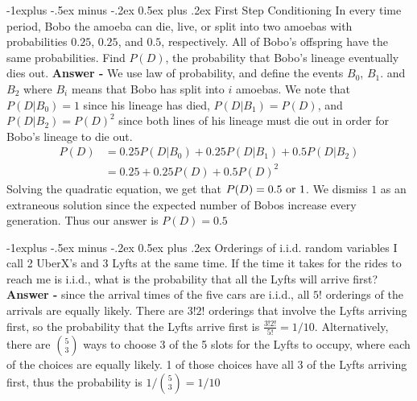\documentclass[10pt,landscape]{article}
\makeatletter
\renewcommand{\subsection}{\@startsection{subsection}{2}{0mm}%
                                {-1explus -.5ex minus -.2ex}%
                                {0.5ex plus .2ex}%
                                {\normalfont\normalsize\bfseries}}
\makeatother
\begin{document}
\begin{multicols}{3}
\subsection{First Step Conditioning} In every time period, Bobo the amoeba can die, live, or split into two amoebas with probabilities $0.25$, $0.25$, and $0.5$, respectively. All of Bobo's offspring have the same probabilities. Find $P(D)$, the probability that Bobo's lineage eventually dies out. \textbf{Answer - } We use law of probability, and define the events $B_0$, $B_1$. and $B_2$ where $B_i$ means that Bobo has split into $i$ amoebas. We note that $P(D | B_0) = 1$ since his lineage has died, $P(D | B_1) = P(D)$, and $P(D | B_2) = P(D)^2$ since  both lines of his lineage must die out in order for Bobo's lineage to die out.
\begin{align*}
P(D) &= 0.25P(D|B_0) + 0.25 P(D|B_1) + 0.5 P(D|B_2)\\
&= 0.25 + 0.25P(D) + 0.5P(D)^2
\end{align*}
Solving the quadratic equation, we get that $P(D) = 0.5 \textnormal{ or } 1$. We dismiss $1$ as an extraneous solution since the expected number of Bobos increase every generation. Thus our answer is $\boxed{P(D) = 0.5}$

\subsection{Orderings of i.i.d. random variables}
I call 2 UberX's and 3 Lyfts at the same time. If the time it takes for the rides to reach me is i.i.d., what is the probability that all the Lyfts will arrive first? \textbf{Answer - } since the arrival times of the five cars are i.i.d., all $5!$ orderings of the arrivals are equally likely. There are $3!2!$ orderings that involve the Lyfts arriving first, so the probability that the Lyfts arrive first is $\boxed{\frac{3!2!}{5!} = 1/10}$. Alternatively, there are ${5 \choose 3}$ ways to choose 3 of the 5 slots for the Lyfts to occupy, where each of the choices are equally likely. 1 of those choices have all 3 of the Lyfts arriving first, thus the probability is $\boxed{1 / {5 \choose 3} = 1/10}$


\end{multicols}
\end{document}

